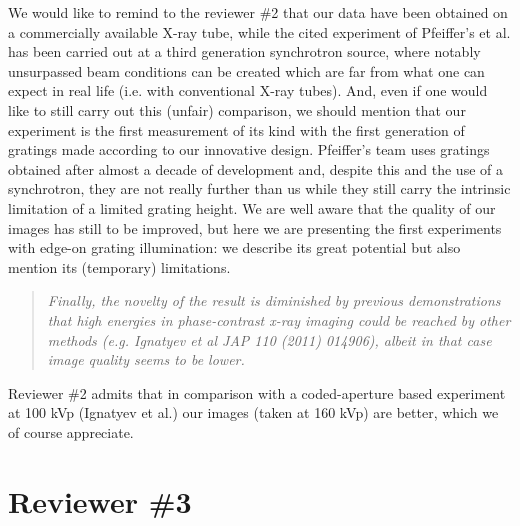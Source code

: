 \documentclass[a4paper,english]{scrartcl}
\newenvironment{reviewerquote}{\begin{quote}\itshape}{\end{quote}}
\begin{document}
We would like to remind to the reviewer \#2 that our data have been obtained on
a commercially available X-ray tube, while the cited experiment of Pfeiffer's
et al. has been carried out at a third generation synchrotron source, where
notably unsurpassed beam conditions can be created which are far from what one
can expect in real life (i.e. with conventional X-ray tubes). And, even if one
would like to still carry out this (unfair) comparison, we should mention that
our experiment is the first measurement of its kind with the first generation
of gratings made according to our innovative design. Pfeiffer's team uses
gratings obtained after almost a decade of development and, despite this and
the use of a synchrotron, they are not really further than us while they still
carry the intrinsic limitation of a limited grating height. We are well aware
that the quality of our images has still to be improved, but here we are
presenting the first experiments with edge-on grating illumination: we describe
its great potential but also mention its (temporary) limitations.
\begin{reviewerquote}
Finally, the novelty of the result is diminished by previous demonstrations that high energies in phase-contrast x-ray imaging could be reached by other methods (e.g. Ignatyev et al JAP 110 (2011) 014906), albeit in that case image quality seems to be lower.     
\end{reviewerquote}
Reviewer \#2 admits that in comparison with a coded-aperture based experiment at 100 kVp (Ignatyev et al.) our images (taken at 160 kVp) are better, which we of course appreciate.

\section*{Reviewer \#3}
\end{document}
